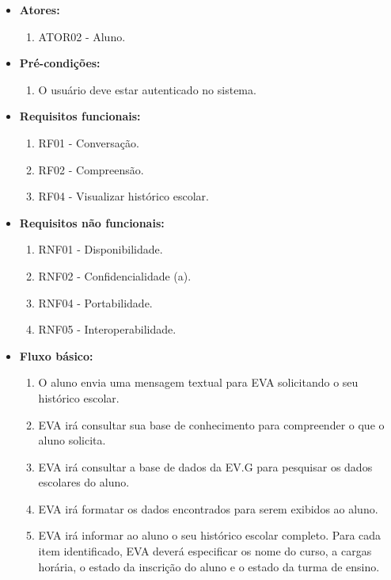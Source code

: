 \begin{itemize}
    \item \textbf{Atores:}
        \begin{enumerate}
            \item ATOR02 - Aluno.
        \end{enumerate}
    \item \textbf{Pré-condições:}
        \begin{enumerate}
            \item O usuário deve estar autenticado no sistema.
        \end{enumerate}
    \item \textbf{Requisitos funcionais:}
        \begin{enumerate}
            \item RF01 - Conversação.
            \item RF02 - Compreensão.
            \item RF04 - Visualizar histórico escolar.
        \end{enumerate}
    \item \textbf{Requisitos não funcionais:}
        \begin{enumerate}
            \item RNF01 - Disponibilidade.
            \item RNF02 - Confidencialidade (a).
            \item RNF04 - Portabilidade.
            \item RNF05 - Interoperabilidade.
        \end{enumerate}
    \item \textbf{Fluxo básico:}
        \begin{enumerate}
            \item O aluno envia uma mensagem textual para EVA solicitando o seu histórico escolar.
            \item EVA irá consultar sua base de conhecimento para compreender o que o aluno solicita.
            \item EVA irá consultar a base de dados da EV.G para pesquisar os dados escolares do aluno.
            \item EVA irá formatar os dados encontrados para serem exibidos ao aluno.
            \item EVA irá informar ao aluno o seu histórico escolar completo. Para cada item identificado, EVA deverá especificar os nome do curso, a cargas horária, o estado da inscrição do aluno e o estado da turma de ensino.

\end{enumerate}
\end{itemize}
